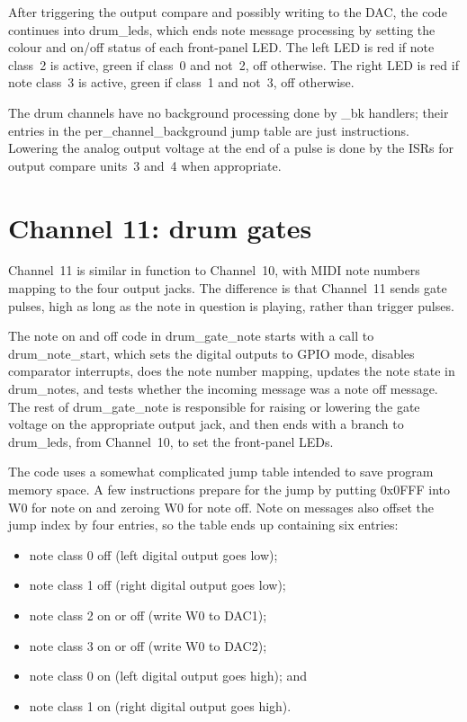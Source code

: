 After triggering the output compare and
possibly writing to the DAC, the code continues into drum\_leds, which ends
note message processing by setting the colour and on/off status of each
front-panel LED.  The left LED is red if note class~2 is active, green if
class~0 and not~2, off otherwise.  The right LED is red if note class~3 is
active, green if class~1 and not~3, off otherwise.

The drum channels have no background processing done by \_bk handlers; their
entries in the per\_channel\_background jump table are just 
instructions.  Lowering the analog output voltage at the end of a pulse is
done by the ISRs for output compare units~3 and~4 when appropriate.

\section{Channel 11:  drum gates}

Channel~11 is similar in function to Channel~10, with MIDI note numbers
mapping to the four output jacks.  The difference is that Channel~11 sends
gate pulses, high as long as the note in question is playing, rather than
trigger pulses.

The note on and off code in drum\_gate\_note starts with a call to
drum\_note\_start, which sets the digital outputs to GPIO mode, disables
comparator interrupts, does the note number mapping, updates the note state
in drum\_notes, and tests whether the incoming message was a note off
message.  The rest of drum\_gate\_note is responsible for raising or
lowering the gate voltage on the appropriate output jack, and then ends with
a branch to drum\_leds, from Channel~10, to set the front-panel LEDs.

The code uses a somewhat complicated jump table intended to save program
memory space.  A few instructions prepare for the jump by putting 0x0FFF
into W0 for note on and zeroing W0 for note off.  Note on messages also
offset the jump index by four entries, so the table ends up containing six
entries:
\begin{itemize}
  \item note class 0 off (left digital output goes low);
  \item note class 1 off (right digital output goes low);
  \item note class 2 on or off (write W0 to DAC1);
  \item note class 3 on or off (write W0 to DAC2);
  \item note class 0 on (left digital output goes high); and
  \item note class 1 on (right digital output goes high).
\end{itemize}

